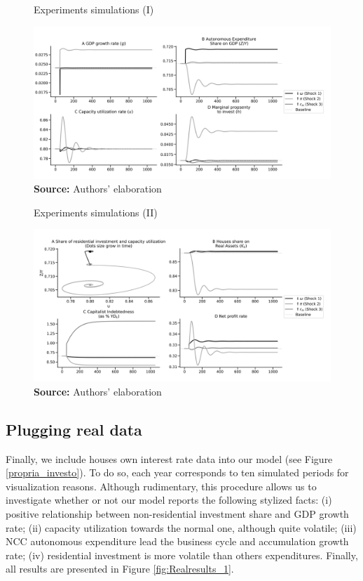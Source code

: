\documentclass[11pt]{article}
\begin{document}
\begin{figure}[htb]
	\centering
	\caption{Experiments simulations (I)}
	\label{fig:results_1}
	\includegraphics[width=.8\textwidth]{./figs/Compared_Shocks_1.png}
	\caption*{\textbf{Source:} Authors' elaboration}
\end{figure}


\begin{figure}[htb]
	\centering
	\caption{Experiments simulations (II)}
	\label{fig:results_2}
	\includegraphics[width=.8\textwidth]{./figs/Compared_Shocks_2.png}
	\caption*{\textbf{Source:} Authors' elaboration}
\end{figure}


\subsection{Plugging real data}
\label{sec:org08da4ac}


Finally, we include houses own interest rate data into our model (see Figure \ref{propria_investo}).
To do so, each year corresponds to ten simulated periods for visualization reasons.
Although rudimentary, this procedure allows us to investigate whether or not our model reports the following stylized facts:
(i) positive relationship between non-residential investment share and GDP growth rate; (ii) capacity utilization towards the normal one, although quite volatile; (iii) NCC autonomous expenditure lead the business cycle and accumulation growth rate; (iv) residential investment is more volatile than others expenditures.
Finally, all results are presented in Figure \ref{fig:Realresults_1}.
\end{document}
